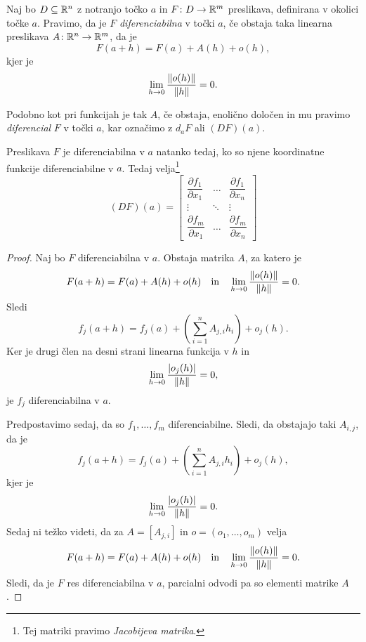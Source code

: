 \begin{okvir}
\begin{definicija}
Naj bo $D \subseteq \mathbb{R}^n$ z notranjo točko $a$ in
$F \colon D \to \mathbb{R}^m$ preslikava, definirana v okolici točke $a$.
Pravimo, da je $F$
\emph{diferenciabilna} v točki
$a$, če obstaja taka linearna preslikava $A \colon \mathbb{R}^n \to \mathbb{R}^m$,
da je
\[
F(a+h) = F(a) + A(h) + o(h),
\]
kjer je
\[
\lim_{h \to 0} \frac{\left\lVert o(h)\right\rVert}{\left\lVert h\right\rVert} = 0.
\]
\end{definicija}
\end{okvir}

\begin{opomba}
Podobno kot pri funkcijah je tak $A$, če obstaja, enolično določen
in mu pravimo \emph{diferencial} $F$ v točki $a$, kar označimo z
$d_aF$ ali $(DF)(a)$.
\end{opomba}

\begin{izrek}
Preslikava $F$ je diferenciabilna v $a$ natanko tedaj, ko so njene
koordinatne funkcije diferenciabilne v $a$. Tedaj velja\footnote{
Tej matriki pravimo \emph{Jacobijeva matrika}.}
\[
(DF)(a) =
\begin{bmatrix}
\dfrac{\partial f_1}{\partial x_1} &
\dots                             &
\dfrac{\partial f_1}{\partial x_n} \\ 
\vdots                            &
\ddots                            &
\vdots                            \\ 
\dfrac{\partial f_m}{\partial x_1} &
\dots                             &
\dfrac{\partial f_m}{\partial x_n}
\end{bmatrix}
\]
\end{izrek}

\begin{proof}
Naj bo $F$ diferenciabilna v $a$. Obstaja matrika $A$, za katero je
\[
F(a+h) = F(a) + A(h) + o(h)
\quad \text{in} \quad
\lim_{h \to 0} \frac{\left\lVert o(h)\right\rVert}{\left\lVert h\right\rVert} = 0.
\]
Sledi
\[
f_j(a+h) = f_j(a) + \left(\sum_{i=1}^n A_{j,i} h_i\right) + o_j(h).
\]
Ker je drugi člen na desni strani linearna funkcija v $h$ in
\[
\lim_{h \to 0} \frac{\left\lvert o_j(h)\right\rvert}{\left\lVert h\right\rVert} = 0,
\]
je $f_j$ diferenciabilna v $a$.

Predpostavimo sedaj, da so $f_1, \dots, f_m$ diferenciabilne.
Sledi, da obstajajo taki $A_{i,j}$, da je
\[
f_j(a+h) = f_j(a) + \left(\sum_{i=1}^n A_{j,i} h_i\right) + o_j(h),
\]
kjer je
\[
\lim_{h \to 0} \frac{\left\lvert o_j(h)\right\rvert}{\left\lVert h\right\rVert} = 0.
\]
Sedaj ni težko videti, da za $A = [A_{j,i}]$ in
$o = (o_1, \dots, o_m)$ velja
\[
F(a+h) = F(a) + A(h) + o(h)
\quad \text{in} \quad
\lim_{h \to 0} \frac{\left\lVert o(h)\right\rVert}{\left\lVert h\right\rVert} = 0.
\]
Sledi, da je $F$ res diferenciabilna v $a$, parcialni odvodi pa so
elementi matrike $A$.
\end{proof}


